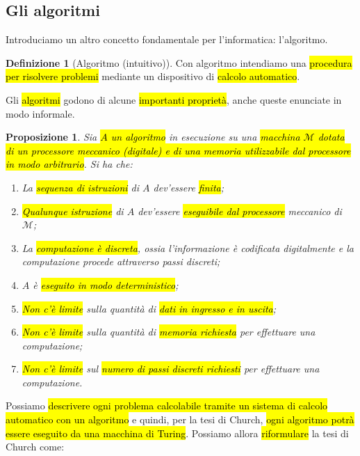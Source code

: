 \documentclass[a4paper,11pt,twoside]{article}
\theoremstyle{plain}
\newtheorem{prop}{Proposizione}[section]
\theoremstyle{definition}
\newtheorem{defn}{Definizione}[section]
\theoremstyle{remark}
\begin{document}
\subsection{Gli algoritmi}

Introduciamo un altro concetto fondamentale per l'informatica: l'algoritmo.

\begin{defn}[Algoritmo (intuitivo)]\label{def:alg-non-formale}
  Con algoritmo intendiamo una \hl{procedura per risolvere problemi} mediante un
  dispositivo di \hl{calcolo automatico}.
\end{defn}

Gli \hl{algoritmi} godono di alcune \hl{importanti proprietà}, anche queste
enunciate in modo informale.

\begin{prop}
  Sia \hl{$A$ un algoritmo} in esecuzione su una \hl{macchina $\mathcal{M}$
  dotata di un processore meccanico (digitale) e di una memoria utilizzabile dal
  processore in modo arbitrario}. Si ha che:

  \begin{enumerate}
    \item La \hl{sequenza di istruzioni} di $A$ dev'essere \hl{finita};
    \item \hl{Qualunque istruzione} di $A$ dev'essere \hl{eseguibile dal
      processore} meccanico di $\mathcal{M}$;
    \item La \hl{computazione è discreta}, ossia l'informazione è codificata
      digitalmente e la computazione procede attraverso passi discreti;
    \item $A$ è \hl{eseguito in modo deterministico};
    \item \hl{Non c'è limite} sulla quantità di \hl{dati in ingresso e in
      uscita};
    \item \hl{Non c'è limite} sulla quantità di \hl{memoria richiesta} per
      effettuare una computazione;
    \item \hl{Non c'è limite} sul \hl{numero di passi discreti richiesti} per
      effettuare una computazione.
  \end{enumerate}
\end{prop}

Possiamo \hl{descrivere ogni problema calcolabile tramite un sistema di calcolo
automatico con un algoritmo} e quindi, per la tesi di Church, \hl{ogni algoritmo
potrà essere eseguito da una macchina di Turing}. Possiamo allora
\hl{riformulare} la tesi di Church come:
\end{document}
